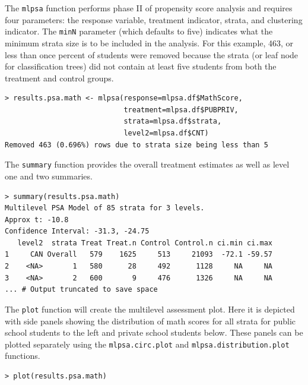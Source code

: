 \documentclass[letterpaper,12p,twoside]{article} %
\begin{document}
\clearpage

The \texttt{mlpsa} function performs phase II of propensity score analysis and requires four parameters: the response variable, treatment indicator, strata, and clustering indicator. The \texttt{minN} parameter (which defaults to five) indicates what the minimum strata size is to be included in the analysis. For this example, 463, or less than once percent of students were removed because the strata (or leaf node for classification trees) did not contain at least five students from both the treatment and control groups.

\begin{verbatim}
> results.psa.math <- mlpsa(response=mlpsa.df$MathScore, 
                            treatment=mlpsa.df$PUBPRIV, 
                            strata=mlpsa.df$strata, 
                            level2=mlpsa.df$CNT)
Removed 463 (0.696%) rows due to strata size being less than 5
\end{verbatim}

\noindent The \texttt{summary} function provides the overall treatment estimates as well as level one and two summaries.

\begin{verbatim}
> summary(results.psa.math)
Multilevel PSA Model of 85 strata for 3 levels.
Approx t: -10.8
Confidence Interval: -31.3, -24.75
   level2  strata Treat Treat.n Control Control.n ci.min ci.max
1     CAN Overall   579    1625     513     21093  -72.1 -59.57
2    <NA>       1   580      28     492      1128     NA     NA
3    <NA>       2   600       9     476      1326     NA     NA
... # Output truncated to save space
\end{verbatim}

\noindent The \texttt{plot} function will create the multilevel assessment plot. Here it is depicted with side panels showing the distribution of math scores for all strata for public school students to the left and private school students below. These panels can be plotted separately using the \texttt{mlpsa.circ.plot} and \texttt{mlpsa.distribution.plot} functions.

\begin{verbatim}
> plot(results.psa.math)
\end{verbatim}
\end{document}
